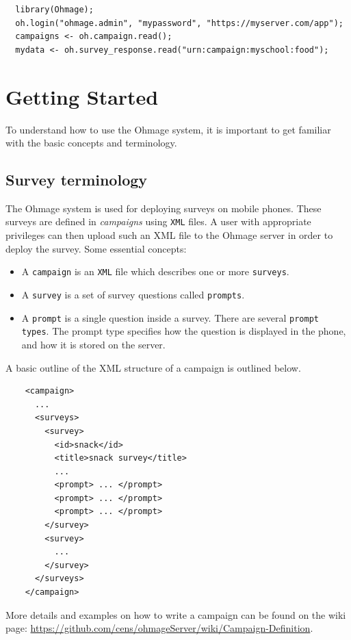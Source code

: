 \documentclass{scrartcl}
\begin{document}
\begin{verbatim}
  library(Ohmage);
  oh.login("ohmage.admin", "mypassword", "https://myserver.com/app");
  campaigns <- oh.campaign.read();
  mydata <- oh.survey_response.read("urn:campaign:myschool:food");
\end{verbatim}

\section{Getting Started}

To understand how to use the Ohmage system, it is important to get familiar with
the basic concepts and terminology.  

\subsection{Survey terminology}

The Ohmage system is used for deploying surveys on mobile phones. These surveys
are defined in \emph{campaigns} using \texttt{XML} files. A user with
appropriate privileges can then upload such an XML file to the Ohmage server in
order to deploy the survey. Some essential concepts:

\begin{itemize}
  \item A \texttt{campaign} is an \texttt{XML} file which describes one or more
  \texttt{surveys}. 
  \item A \texttt{survey} is a set of survey questions called \texttt{prompts}.
  \item A \texttt{prompt} is a single question inside a survey. There are
  several \texttt{prompt types}. The prompt type specifies how the question is
  displayed in the phone, and how it is stored on the server.
\end{itemize}

\noindent A basic outline of the XML structure of a campaign is outlined below.

\begin{verbatim}
    <campaign>
      ... 
      <surveys>
        <survey>
          <id>snack</id>
          <title>snack survey</title>
          ...
          <prompt> ... </prompt>
          <prompt> ... </prompt>
          <prompt> ... </prompt>
        </survey>
        <survey>
          ...
        </survey>
      </surveys>
    </campaign>
\end{verbatim}

\noindent More details and examples on how to write a campaign can be found on
the wiki page:
\url{https://github.com/cens/ohmageServer/wiki/Campaign-Definition}.
\end{document}
